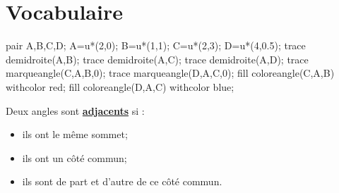 \section{Vocabulaire}

\begin{definition}
   \begin{minipage}{0.3\linewidth}
      \begin{center}
         \begin{Geometrie}[CoinHD={(5u,3u)}]
            pair A,B,C,D;
            A=u*(2,0);
            B=u*(1,1);
            C=u*(2,3);
            D=u*(4,0.5);
            trace demidroite(A,B);
            trace demidroite(A,C);
            trace demidroite(A,D);
            trace marqueangle(C,A,B,0);
            trace marqueangle(D,A,C,0);
            fill coloreangle(C,A,B) withcolor red;
            fill coloreangle(D,A,C) withcolor blue;
         \end{Geometrie}
      \end{center}
   \end{minipage}
   \hfill
   \begin{minipage}{0.6\linewidth}
      Deux angles sont \textbf{\underline{adjacents}} si :
      \begin{itemize}
         \item  ils ont le même sommet;
         \item  ils ont un côté commun;
         \item  ils sont de part et d'autre de ce côté commun.
      \end{itemize}
   \end{minipage}
\end{definition}

